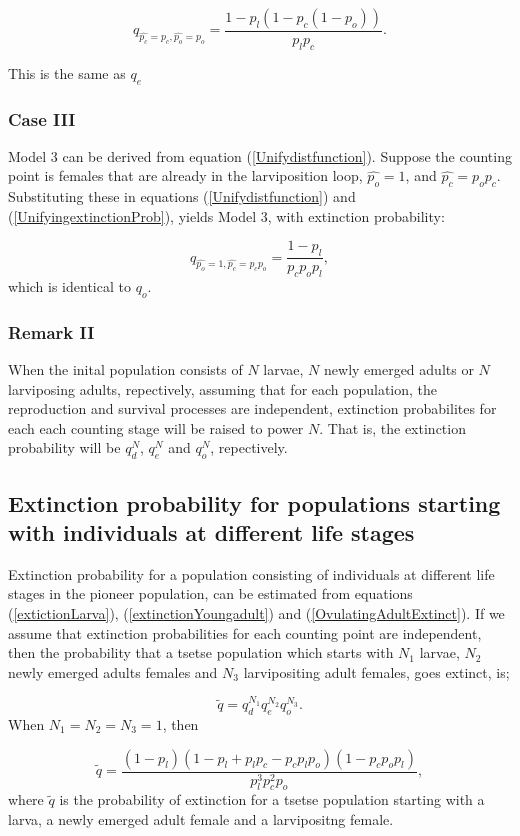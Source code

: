 $$q_{\hat{p_c}=p_{c},\hat{p_o}=p_{o}} = \frac{1- p_{l}(1 - p_{c}(1- p_{o}))}{p_{l}p_{c}}. $$

This is the same as $q_{e}$

\subsubsection*{Case III}
Model 3 can be derived from equation (\ref{Unifydistfunction}). Suppose the counting point is females that are already in the larviposition loop, $\hat{p_o}=1$, and $\hat{p_c}=p_{o}p_{c}$. Substituting these in equations (\ref{Unifydistfunction}) and (\ref{UnifyingextinctionProb}), yields Model 3, with extinction probability:  

$$q_{\hat{p_o}=1,\hat{p_c}=p_{c}p_{o}} = \frac{1-p_{l}}{p_{c}p_{o}p_{l}},$$ 
which is identical to $q_{o}.$
\subsubsection*{\bf Remark II}
When the inital population consists of $N$ larvae, $N$ newly emerged adults or $N$ larviposing adults, repectively, assuming that for each population, the reproduction and survival processes are independent, extinction probabilites for each each counting stage will be raised to power $N$. That is, the extinction probability will be $q_d^N$, $q_e^N$ and $q_o^N$, repectively.  


\subsection{Extinction probability for  populations starting with individuals at different life stages}
 Extinction probability for a population consisting of individuals at different life stages in the pioneer population, can be estimated  from equations (\ref{extictionLarva}), (\ref{extinctionYoungadult}) and (\ref{OvulatingAdultExtinct}). If we assume that extinction probabilities for each counting point are independent, then the probability that a tsetse population which starts with $N_1$ larvae, $N_2$ newly emerged adults females and $N_3$ larvipositing adult females, goes extinct, is; 


$$\tilde{q} = q_{d}^{N_1}q_{e}^{N_2}q_{o}^{N_3}.$$ When $N_1 = N_2 =N_3=1$, then

\begin{equation}
\label{jointextinction}
\tilde{q} = \frac{(1-p_{l})(1- p_{l}+p_{l}p_{c} - p_{c}p_{l}p_{o})(1-p_{c}p_{o}p_{l})}{p_{l}^{3}p_{c}^{2}p_{o}},
\end{equation} 
where $\tilde{q}$ is the probability of extinction for a tsetse population starting with a larva, a newly emerged adult female and a larvipositng female.  

